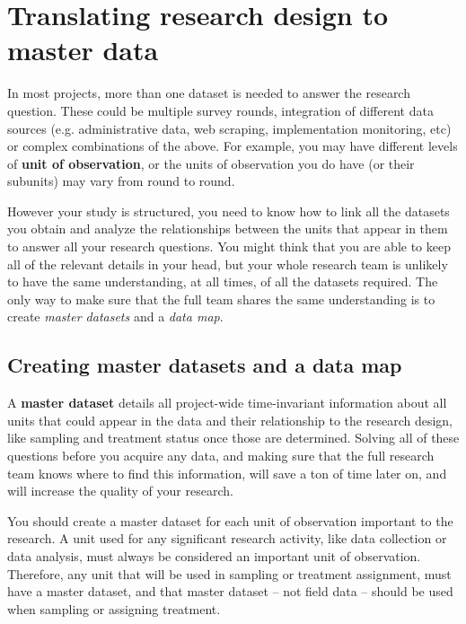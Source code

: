 
\section{Translating research design to master data}

In most projects, more than one dataset is needed to answer the research question.
These could be multiple survey rounds,
integration of different data sources (e.g. administrative data,
web scraping, implementation monitoring, etc)
or complex combinations of the above.
For example, you may have different levels of \textbf{unit of observation},
or the units of observation you do have (or their subunits)
may vary from round to round.

However your study is structured, you need to know how to link all the datasets you obtain
and analyze the relationships between the units that appear in them
to answer all your research questions.
You might think that you are able to keep all of the relevant details in your head,
but your whole research team is unlikely to have the same understanding,
at all times, of all the datasets required.
The only way to make sure that the full team shares the same understanding
is to create \textit{master datasets} and a \textit{data map}.


\subsection{Creating master datasets and a data map}

A \textbf{master dataset}
details all project-wide time-invariant information
about all units that could appear in the data
and their relationship to the research design,
like sampling and treatment status once those are determined.
Solving all of these questions before you acquire any data,
and making sure that the full research team knows where to find this information,
will save a ton of time later on,
and will increase the quality of your research.

You should create a master dataset
for each unit of observation
important to the research.
A unit used for any significant research activity,
like data collection or data analysis, 
must always be considered an important unit of observation.
Therefore, any unit
that will be used in sampling or treatment assignment,
must have a master dataset,
and that master dataset -- not field data --
should be used when sampling or assigning treatment.

